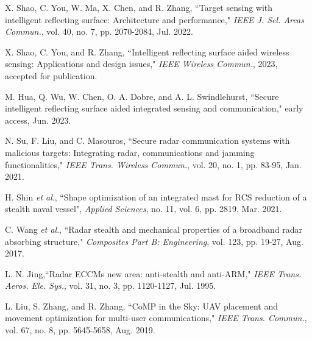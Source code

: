 \documentclass[10pt,final,doublecolumn]{IEEEtran}
\begin{document}
\begin{thebibliography}{1}
X. Shao, C. You, W. Ma, X. Chen, and R. Zhang, ``Target sensing with
intelligent reflecting surface: Architecture and performance," \emph{IEEE J. Sel. Areas Commun.}, vol. 40, no. 7, pp. 2070-2084, Jul. 2022.

X. Shao, C. You, and R. Zhang, ``Intelligent reflecting surface
aided wireless sensing: Applications and design issues," \emph{IEEE Wireless Commun.}, 2023, accepted for publication.

M. Hua, Q. Wu, W. Chen, O. A. Dobre, and A. L. Swindlehurst, ``Secure intelligent reflecting surface aided integrated sensing and communication," early access, Jun. 2023.

N. Su, F. Liu, and C. Masouros, ``Secure radar communication systems with malicious targets: Integrating radar, communications and jamming functionalities," \emph{IEEE Trans. Wireless Commun.}, vol. 20, no. 1, pp. 83-95, Jan. 2021.

%

H. Shin \emph{et al}., ``Shape optimization of an integrated mast for RCS reduction of a stealth naval vessel", \emph{Applied Sciences}, no. 11, vol. 6, pp. 2819, Mar. 2021.


C. Wang \emph{et al}., ``Radar stealth and mechanical properties of a broadband radar absorbing structure," \emph{Composites Part B: Engineering}, vol. 123, pp. 19-27, Aug. 2017.


L. N. Jing,``Radar ECCMs new area: anti-stealth and anti-ARM," \emph{IEEE Trans. Aeros. Ele. Sys.}, vol. 31, no. 3, pp. 1120-1127, Jul. 1995.

L. Liu, S. Zhang, and R. Zhang, ``CoMP in the Sky: UAV placement and movement optimization for multi-user communications," \emph{IEEE Trans. Commun.}, vol. 67, no. 8, pp. 5645-5658, Aug. 2019.



\end{thebibliography}
\end{document}
